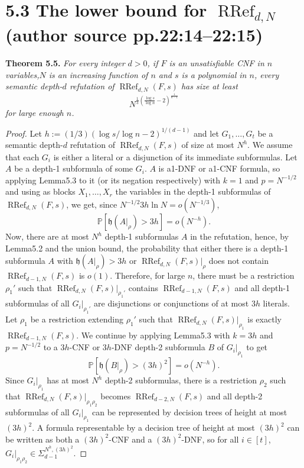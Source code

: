 \documentclass[10pt,a4paper]{article}
\newcommand{\RRef}{\operatorname{RRef}}
\newcommand{\height}{\mathfrak h}
\newenvironment{originalresult}[1]{\par\medskip\noindent\textbf{#1.}\itshape}{\par\medskip}
\begin{document}
\section*{5.3 The lower bound for $\RRef_{d,N}$ (author source pp.22:14--22:15)}
\begin{originalresult}{Theorem 5.5}
For every integer $d>0$, if $F$ is an unsatisfiable CNF in $n$ variables,$N$ is an increasing function of $n$ and $s$ is a polynomial in $n$, every semantic depth-$d$ refutation of $\RRef_{d,N}(F,s)$ has size at least
\[N^{\frac13\left(\frac{\log s}{\log n}-2\right)^{\frac1{d-1}}}\]
for large enough $n$.
\end{originalresult}
\begin{proof}
Let $h:=(1/3)(\log s/\log n-2)^{1/(d-1)}$ and let $G_1,\ldots,G_t$ be a semantic depth-$d$ refutation of $\RRef_{d,N}(F,s)$ of size at most $N^h$. We assume that each $G_i$ is either a literal or a disjunction of its immediate subformulas. Let $A$ be a depth-1 subformula of some $G_i$. $A$ is a1-DNF or a1-CNF formula, so applying Lemma5.3 to it (or its negation respectively) with $k=1$ and $p=N^{-1/2}$ and using as blocks $X_1,\ldots,X_r$ the variables in the depth-1 subformulas of $\RRef_{d,N}(F,s)$, we get, since $N^{-1/2}3h\ln N=o(N^{-1/3})$,
\[\mathbb P[\height(A|_\rho)>3h]=o(N^{-h}).\]
Now, there are at most $N^h$ depth-1 subformulas $A$ in the refutation, hence, by Lemma5.2 and the union bound, the probability that either there is a depth-1 subformula $A$ with $\height(A|_\rho)>3h$ or $\RRef_{d,N}(F,s)|_\rho$ does not contain $\RRef_{d-1,N}(F,s)$ is $o(1)$. Therefore, for large $n$, there must be a restriction $\rho_1'$ such that $\RRef_{d,N}(F,s)|_{\rho_1'}$ contains $\RRef_{d-1,N}(F,s)$ and all depth-1 subformulas of all $G_i|_{\rho_1'}$ are disjunctions or conjunctions of at most $3h$ literals. Let $\rho_1$ be a restriction extending $\rho_1'$ such that $\RRef_{d,N}(F,s)|_{\rho_1}$ is exactly $\RRef_{d-1,N}(F,s)$.
We continue by applying Lemma5.3 with $k=3h$ and $p=N^{-1/2}$ to a $3h$-CNF or $3h$-DNF depth-2 subformula $B$ of $G_i|_{\rho_1}$ to get
\[\mathbb P[\height(B|_\rho)>(3h)^2]=o(N^{-h}).\]
Since $G_i|_{\rho_1}$ has at most $N^h$ depth-2 subformulas, there is a restriction $\rho_2$ such that $\RRef_{d,N}(F,s)|_{\rho_1\rho_2}$ becomes $\RRef_{d-2,N}(F,s)$ and all depth-2 subformulas of all $G_i|_{\rho_1}$ can be represented by decision trees of height at most $(3h)^2$. A formula representable by a decision tree of height at most $(3h)^2$ can be written as both a $(3h)^2$-CNF and a $(3h)^2$-DNF, so for all $i\in[t]$, $G_i|_{\rho_1\rho_2}\in\Sigma_{d-1}^{N^h,(3h)^2}$.

\end{proof}
\end{document}

